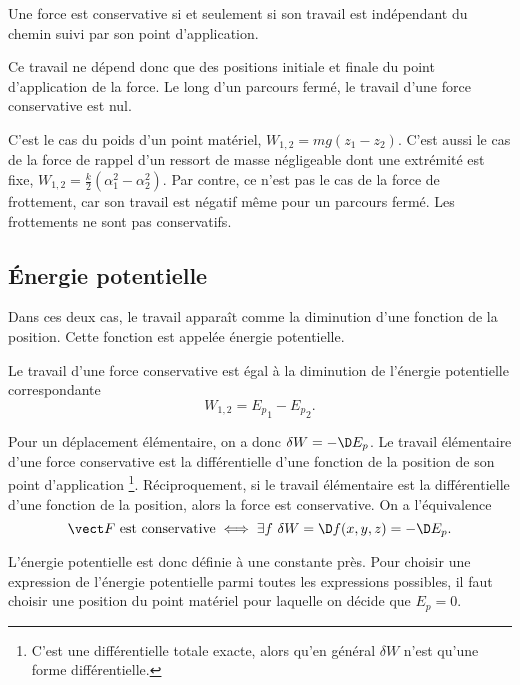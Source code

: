 \begin{defdef}
  Une force est conservative si et seulement si son travail est indépendant du chemin suivi par son point d'application.
\end{defdef}

Ce travail ne dépend donc que des positions initiale et finale du point d'application de la force. Le long d'un parcours fermé, le travail d'une force conservative est nul.

C'est le cas du poids d'un point matériel, $W_{1,2}=mg(z_1-z_2)$. C'est aussi le cas de la force de rappel d'un ressort de masse négligeable dont une extrémité est fixe, $W_{1, 2} = \frac{k}{2}(\alpha_1^2 - \alpha_2^2)$. Par contre, ce n'est pas le cas de la force de frottement, car son travail est négatif même pour un parcours fermé. Les frottements ne sont pas conservatifs.

\subsection{Énergie potentielle}
\label{chap4-subsec:energiepotentielle}

Dans ces deux cas, le travail apparaît comme la diminution d'une fonction de la position. Cette fonction est appelée énergie potentielle.
\begin{defdef}
  Le travail d'une force conservative est égal à la diminution de l'énergie potentielle correspondante
  \begin{equation}
    W_{1, 2}={E_p}_1 -{E_p}_2.
  \end{equation}
\end{defdef}

Pour un déplacement élémentaire, on a donc $\delta W = -\D E_p$. Le travail élémentaire d'une force conservative est la différentielle d'une fonction de la position de son point d'application \footnote{C'est une différentielle totale exacte, alors qu'en général $\delta W$ n'est qu'une forme différentielle.}. Réciproquement, si le travail élémentaire est la différentielle d'une fonction de la position, alors la force est conservative. On a l'équivalence
\begin{equation}
  \vF \text{~est conservative} \iff \exists f \ \delta W = \D f(x,y,z) = -\D E_p.
\end{equation}

L'énergie potentielle est donc définie à une constante près. Pour choisir une expression de l'énergie potentielle parmi toutes les expressions possibles, il faut choisir une position du point matériel pour laquelle on décide que $E_p=0$.

